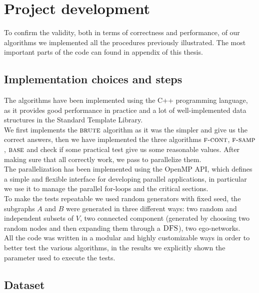 
\chapter{Project development}
    
    To confirm the validity, both in terms of correctness and performance, of our algorithms we implemented all the procedures previously illustrated. 
    The most important parts of the code can found in appendix of this thesis.
    
    \section{Implementation choices and steps}
    
    The algorithms have been implemented using the C++ programming language, 
    as it provides good performance in practice and a lot of well-implemented data structures in the Standard Template Library.\\
    
    We first implements the $\textsc{brute}$ algorithm as it was the simpler and give us the correct answers, then we have implemented the three algorithms $\textsc{f-cont}$, $\textsc{f-samp}$, $\textsc{base}$ and check if some practical test give us some reasonable values.
    After making sure that all correctly work, we pass to parallelize them.\\
    
    The parallelization has been implemented using the OpenMP API, which defines a simple and flexible interface for developing parallel applications, in particular we use it to manage the parallel for-loops and the critical sections.\\
    
    To make the tests repeatable we used random generators with fixed seed, the subgraphs $A$ and $B$ were generated in three different ways: two random and independent subsets of $V$, two connected component (generated by choosing two random nodes and then expanding them through a $\textsc{DFS}$), two ego-networks.\\
    
    All the code was written in a modular and highly customizable ways in order
    to better test the various algorithms, in the results we explicitly shown the parameter used to execute the tests.
    
    \clearpage
    \section{Dataset}
    

